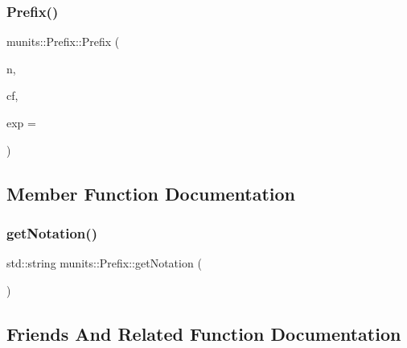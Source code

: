 \subsubsection{\texorpdfstring{Prefix()}{Prefix()}}
{\footnotesize\ttfamily munits\+::\+Prefix\+::\+Prefix (\begin{DoxyParamCaption}\item[{const std\+::string}]{n,  }\item[{const \hyperlink{classmunits_1_1_converter_function}{munits\+::\+Converter\+Function} \&}]{cf,  }\item[{int}]{exp = {} }\end{DoxyParamCaption})\hspace{0.3cm}{\ttfamily [inline]}}



\subsection{Member Function Documentation}
\mbox{\label{classmunits_1_1_prefix_a3cc3d1b3ed55c756b8baa98ea1369e65}} 
\subsubsection{\texorpdfstring{get\+Notation()}{getNotation()}}
{\footnotesize\ttfamily std\+::string munits\+::\+Prefix\+::get\+Notation (\begin{DoxyParamCaption}{ }\end{DoxyParamCaption})\hspace{0.3cm}{\ttfamily [inline]}}



\subsection{Friends And Related Function Documentation}
\mbox{\label{classmunits_1_1_prefix_a69fa2333393cf327262c44ec78eef70b}} 
